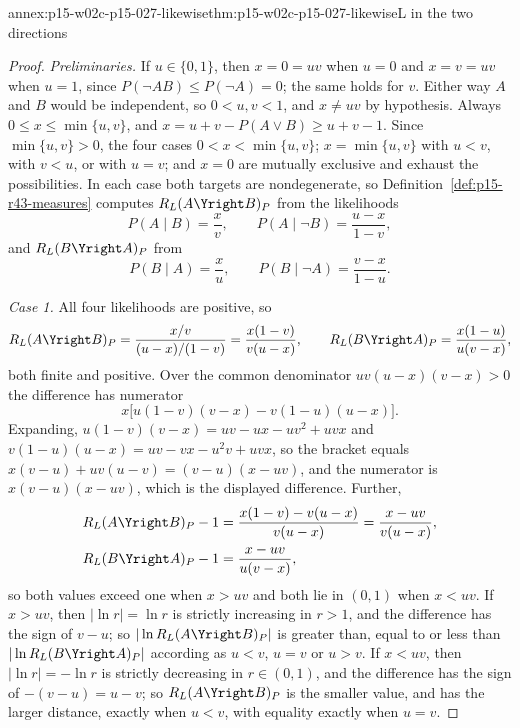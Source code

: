\begin{annexitem}{annex:p15-w02c-p15-027-likewise}{thm:p15-w02c-p15-027-likewise}{L in the two directions}
\begin{proof}
\emph{Preliminaries.} If \(u\in\{0,1\}\), then \(x=0=uv\) when \(u=0\)
and \(x=v=uv\) when \(u=1\), since \(P(\neg A B)\leq P(\neg A)=0\); the
same holds for \(v\). Either way \(A\) and \(B\) would be independent,
so \(0<u,v<1\), and \(x\ne uv\) by hypothesis. Always
\(0\leq x\leq\min\{u,v\}\), and \(x=u+v-P(A\vee B)\geq u+v-1\). Since
\(\min\{u,v\}>0\), the four cases \(0<x<\min\{u,v\}\);
\(x=\min\{u,v\}\) with \(u<v\), with \(v<u\), or with \(u=v\); and
\(x=0\) are mutually exclusive and exhaust the possibilities. In each
case both targets are nondegenerate, so
Definition~\ref{def:p15-r43-measures} computes \(R_L(A\Yright B)_P\)
from the likelihoods
\[
 P(A\mid B)=\frac{x}{v},\qquad P(A\mid\neg B)=\frac{u-x}{1-v},
\]
and \(R_L(B\Yright A)_P\) from
\[
 P(B\mid A)=\frac{x}{u},\qquad P(B\mid\neg A)=\frac{v-x}{1-u}.
\]

\emph{Case 1.} All four likelihoods are positive, so
\[
 R_L(A\Yright B)_P=\frac{x/v}{(u-x)/(1-v)}=\frac{x(1-v)}{v(u-x)},\qquad
 R_L(B\Yright A)_P=\frac{x(1-u)}{u(v-x)},
\]
both finite and positive. Over the common denominator
\(uv(u-x)(v-x)>0\) the difference has numerator
\[
 x\bigl[u(1-v)(v-x)-v(1-u)(u-x)\bigr].
\]
Expanding, \(u(1-v)(v-x)=uv-ux-uv^2+uvx\) and
\(v(1-u)(u-x)=uv-vx-u^2v+uvx\), so the bracket equals
\(x(v-u)+uv(u-v)=(v-u)(x-uv)\), and the numerator is
\(x(v-u)(x-uv)\), which is the displayed difference. Further,
\[
\begin{aligned}
 R_L(A\Yright B)_P-1&=\frac{x(1-v)-v(u-x)}{v(u-x)}=\frac{x-uv}{v(u-x)},\\
 R_L(B\Yright A)_P-1&=\frac{x-uv}{u(v-x)},
\end{aligned}
\]
so both values exceed one when \(x>uv\) and both lie in \((0,1)\) when
\(x<uv\). If \(x>uv\), then \(|\ln r|=\ln r\) is strictly increasing in
\(r>1\), and the difference has the sign of \(v-u\); so
\(|\ln R_L(A\Yright B)_P|\) is greater than, equal to or less than
\(|\ln R_L(B\Yright A)_P|\) according as \(u<v\), \(u=v\) or \(u>v\).
If \(x<uv\), then \(|\ln r|=-\ln r\) is strictly decreasing in
\(r\in(0,1)\), and the difference has the sign of \(-(v-u)=u-v\); so
\(R_L(A\Yright B)_P\) is the smaller value, and has the larger distance,
exactly when \(u<v\), with equality exactly when \(u=v\).


\end{proof}
\end{annexitem}
